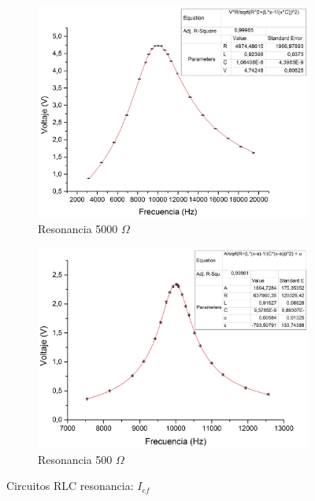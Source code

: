 \documentclass[11pt,a4paper]{article}
\begin{document}
\begin{figure}[h!]

\begin{subfigure}{0.5\textwidth}
\includegraphics[scale=0.3]{RLC_RES_5000_VvsF}
  \caption{Resonancia 5000 $\Omega$}
  \label{subfig:RES_I.a}
\end{subfigure}
\begin{subfigure}{0.5\textwidth}
\includegraphics[scale=0.32]{RLC_RES_500_VvsF}
  \caption{Resonancia 500 $\Omega$}
  \label{subfig:RES_I.b}
\end{subfigure}
  \caption{Circuitos RLC resonancia: $I_{ef}$}
  \label{fig:RES_I}
\end{figure}
\end{document}
